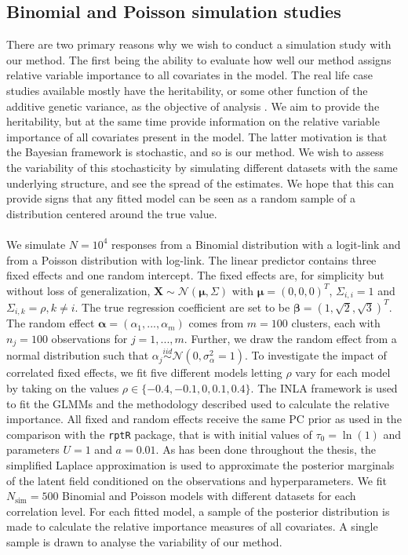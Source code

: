 \subsection{Binomial and Poisson simulation studies}
\label{sec:simulation_study}
There are two primary reasons why we wish to conduct a simulation study with our method. The first being the ability to evaluate how well our method assigns relative variable importance to all covariates in the model. The real life case studies available mostly have the heritability, or some other function of the additive genetic variance, as the objective of analysis \citep{Stensland_GMRF_bayes_animal_model}. We aim to provide the heritability, but at the same time provide information on the relative variable importance of all covariates present in the model. The latter motivation is that the Bayesian framework is stochastic, and so is our method. We wish to assess the variability of this stochasticity by simulating different datasets with the same underlying structure, and see the spread of the estimates. We hope that this can provide signs that any fitted model can be seen as a random sample of a distribution centered around the true value.
\\
\\
We simulate $N=10^4$ responses from a Binomial distribution with a logit-link and from a Poisson distribution with log-link. The linear predictor contains three fixed effects and one random intercept. The fixed effects are, for simplicity but without loss of generalization, $\mathbf{X} \sim \mathcal{N}(\boldsymbol{\mu}, \Sigma)$ with $\boldsymbol{\mu} = (0, 0, 0)^T$, $\Sigma_{i, i} = 1$ and $\Sigma_{i, k} = \rho, k \neq i$. The true regression coefficient are set to be $\boldsymbol{\beta}=(1, \sqrt{2}, \sqrt{3})^T$. The random effect  $\boldsymbol{\alpha}=(\alpha_1, ..., \alpha_m)$ comes from $m=100$ clusters, each with $n_j=100$ observations for $j=1, ..., m$. Further, we draw the random effect from a normal distribution such that $\alpha_j \stackrel{iid}{\sim} \mathcal{N}(0, \sigma^2_{\alpha}=1)$. To investigate the impact of correlated fixed effects, we fit five different models letting $\rho$ vary for each model by taking on the values $\rho \in \{-0.4, -0.1, 0, 0.1, 0.4\}$. The INLA framework is used to fit the GLMMs and the methodology described used to calculate the relative importance. All fixed and random effects receive the same PC prior as used in the comparison with the \texttt{rptR} package, that is with initial values of $\tau_0=\ln(1)$ and parameters $U=1$ and $a=0.01$. As has been done throughout the thesis, the simplified Laplace approximation is used to approximate the posterior marginals of the latent field conditioned on the observations and hyperparameters. We fit $N_{\text{sim}}=500$ Binomial and Poisson models with different datasets for each correlation level. For each fitted model, a sample of the posterior distribution is made to calculate the relative importance measures of all covariates. A single sample is drawn to analyse the variability of our method. 
